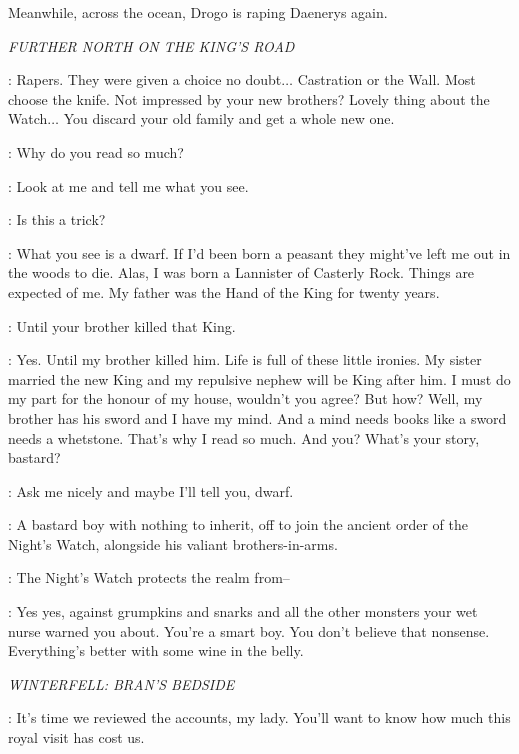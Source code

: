 \scene

\n Meanwhile, across the ocean, Drogo is raping Daenerys again.

\scene

\textit{FURTHER NORTH ON THE KING'S ROAD}


\TYRION: Rapers. They were given a choice no doubt$\ldots$ Castration or the Wall. Most choose the knife. Not impressed by your new brothers? Lovely thing about the Watch$\ldots$ You discard your old family and get a whole new one. 

\JON: Why do you read so much? 

\TYRION: Look at me and tell me what you see. 

\JON: Is this a trick? 

\TYRION: What you see is a dwarf. If I'd been born a peasant they might've left me out in the woods to die. Alas, I was born a Lannister of Casterly Rock. Things are expected of me. My father was the Hand of the King for twenty years. 

\JON: Until your brother killed that King. 

\TYRION: Yes. Until my brother killed him. Life is full of these little ironies. My sister married the new King and my repulsive nephew will be King after him. I must do my part for the honour of my house, wouldn't you agree? But how? Well, my brother has his sword and I have my mind. And a mind needs books like a sword needs a whetstone. That's why I read so much. And you? What's your story, bastard? 

\JON: Ask me nicely and maybe I'll tell you, dwarf. 

\TYRION: A bastard boy with nothing to inherit, off to join the ancient order of the Night's Watch, alongside his valiant brothers-in-arms. 

\JON: The Night's Watch protects the realm from--

\TYRION: Yes yes, against grumpkins and snarks and all the other monsters your wet nurse warned you about. You're a smart boy. You don't believe that nonsense. Everything's better with some wine in the belly. 

\scene

\textit{WINTERFELL: BRAN'S BEDSIDE}


\LUWIN: It's time we reviewed the accounts, my lady. You'll want to know how much this royal visit has cost us. 

